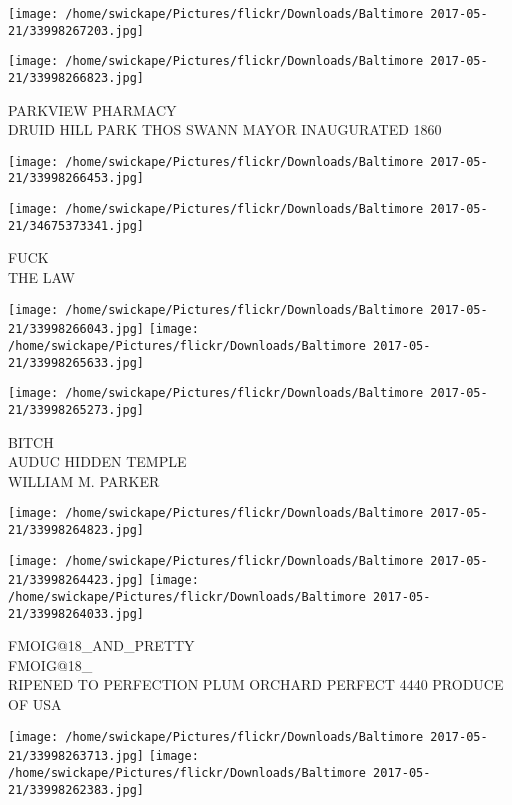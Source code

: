 \documentclass[10pt,letterpaper]{article}
\begin{document}
\texttt{[image: /home/swickape/Pictures/flickr/Downloads/Baltimore 2017-05-21/33998267203.jpg]}

\vspace{0.25in}
\texttt{[image: /home/swickape/Pictures/flickr/Downloads/Baltimore 2017-05-21/33998266823.jpg]}

PARKVIEW PHARMACY\\
DRUID HILL PARK THOS SWANN MAYOR INAUGURATED 1860\\
\pagebreak

\texttt{[image: /home/swickape/Pictures/flickr/Downloads/Baltimore 2017-05-21/33998266453.jpg]}

\vspace{0.25in}
\texttt{[image: /home/swickape/Pictures/flickr/Downloads/Baltimore 2017-05-21/34675373341.jpg]}

FUCK\\
THE LAW\\
\pagebreak

\texttt{[image: /home/swickape/Pictures/flickr/Downloads/Baltimore 2017-05-21/33998266043.jpg]}
\texttt{[image: /home/swickape/Pictures/flickr/Downloads/Baltimore 2017-05-21/33998265633.jpg]}

\vspace{0.25in}
\texttt{[image: /home/swickape/Pictures/flickr/Downloads/Baltimore 2017-05-21/33998265273.jpg]}

BITCH\\
AUDUC HIDDEN TEMPLE\\
WILLIAM M. PARKER\\
\pagebreak

\texttt{[image: /home/swickape/Pictures/flickr/Downloads/Baltimore 2017-05-21/33998264823.jpg]}

\vspace{0.25in}
\texttt{[image: /home/swickape/Pictures/flickr/Downloads/Baltimore 2017-05-21/33998264423.jpg]}
\texttt{[image: /home/swickape/Pictures/flickr/Downloads/Baltimore 2017-05-21/33998264033.jpg]}

FMOIG@18\_AND\_PRETTY\\
FMOIG@18\_\\
RIPENED TO PERFECTION PLUM ORCHARD PERFECT 4440 PRODUCE OF USA\\
\pagebreak

\texttt{[image: /home/swickape/Pictures/flickr/Downloads/Baltimore 2017-05-21/33998263713.jpg]}
\texttt{[image: /home/swickape/Pictures/flickr/Downloads/Baltimore 2017-05-21/33998262383.jpg]}
\end{document}
